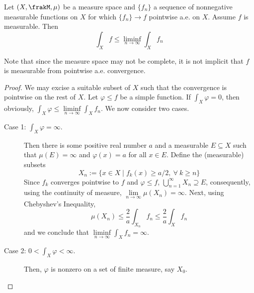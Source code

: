 \begin{lemma}[Fatou]
    Let $(X,\frakM,\mu)$ be a measure space and $\{f_n\}$ a sequence of nonnegative measurable functions on $X$ for which $\{f_n\}\to f$ pointwise a.e. on $X$. Assume $f$ is measurable. Then 
    \begin{equation*}
        \int_X f\le\liminf_{n\to\infty}\int_X f_n
    \end{equation*}
\end{lemma}
Note that since the measure space may not be complete, it is not implicit that $f$ is measurable from pointwise a.e. convergence.
\begin{proof}
    We may excise a suitable subset of $X$ such that the convergence is pointwise on the rest of $X$. Let $\varphi\le f$ be a simple function. If $\int_X\varphi = 0$, then obviously, $\int_X\varphi\le\liminf\limits_{n\to\infty}\int_X f_n$. We now consider two cases.
    \begin{description}
    \item[Case 1: $\int_X\varphi = \infty$.] Then there is some positive real number $a$ and a measurable $E\subseteq X$ such that $\mu(E) = \infty$ and $\varphi(x) = a$ for all $x\in E$. Define the (measurable) subsets 
    \begin{equation*}
        X_n := \{x\in X\mid f_k(x)\ge a/2,~\forall~k\ge n\}
    \end{equation*}
    Since $f_k$ converges pointwise to $f$ and $\varphi\le f$, $\bigcup\limits_{n = 1}^\infty X_n\supseteq E$, consequently, using the continuity of measure, $\lim\limits_{n\to\infty}\mu(X_n) = \infty$. Next, using Chebyshev's Inequality, 
    \begin{equation*}
        \mu(X_n)\le\frac{2}{a}\int_{X_n}f_n\le\frac{2}{a}\int_X f_n
    \end{equation*}
    and we conclude that $\liminf\limits_{n\to\infty}\int_X f_n = \infty$.

    \item[Case 2: $0 < \int_X\varphi < \infty$.] Then, $\varphi$ is nonzero on a set of finite measure, say $X_0$.
    \end{description}
\end{proof}

